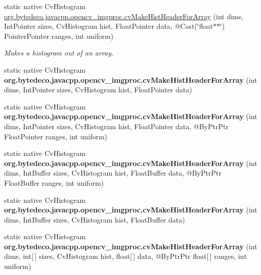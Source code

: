 \begin{DoxyCompactItemize}
\item 
static native Cv\+Histogram \hyperlink{group__imgproc__c_ga2bdfb77a902cc0010861d3960e11a5c9}{org.\+bytedeco.\+javacpp.\+opencv\+\_\+imgproc.\+cv\+Make\+Hist\+Header\+For\+Array} (int dims, Int\+Pointer sizes, Cv\+Histogram hist, Float\+Pointer data, @Cast(\char`\"{}float$\ast$$\ast$\char`\"{}) Pointer\+Pointer ranges, int uniform)
\begin{DoxyCompactList}\small\item\em Makes a histogram out of an array. \end{DoxyCompactList}\item 
\mbox{\label{group__imgproc__c_ga503497524c496d0a0bd9bcaf55c50490}} 
static native Cv\+Histogram {\bfseries org.\+bytedeco.\+javacpp.\+opencv\+\_\+imgproc.\+cv\+Make\+Hist\+Header\+For\+Array} (int dims, Int\+Pointer sizes, Cv\+Histogram hist, Float\+Pointer data)
\item 
\mbox{\label{group__imgproc__c_gafaedabac4c962960594e3a3651c6718e}} 
static native Cv\+Histogram {\bfseries org.\+bytedeco.\+javacpp.\+opencv\+\_\+imgproc.\+cv\+Make\+Hist\+Header\+For\+Array} (int dims, Int\+Pointer sizes, Cv\+Histogram hist, Float\+Pointer data, @By\+Ptr\+Ptr Float\+Pointer ranges, int uniform)
\item 
\mbox{\label{group__imgproc__c_gafee82abdcb505c7f765a0e654ad3dd17}} 
static native Cv\+Histogram {\bfseries org.\+bytedeco.\+javacpp.\+opencv\+\_\+imgproc.\+cv\+Make\+Hist\+Header\+For\+Array} (int dims, Int\+Buffer sizes, Cv\+Histogram hist, Float\+Buffer data, @By\+Ptr\+Ptr Float\+Buffer ranges, int uniform)
\item 
\mbox{\label{group__imgproc__c_ga0c3d0f9001f259bd01c0a5f1237398ba}} 
static native Cv\+Histogram {\bfseries org.\+bytedeco.\+javacpp.\+opencv\+\_\+imgproc.\+cv\+Make\+Hist\+Header\+For\+Array} (int dims, Int\+Buffer sizes, Cv\+Histogram hist, Float\+Buffer data)
\item 
\mbox{\label{group__imgproc__c_gaf8c231c42f2a447fb571eb8306df22f4}} 
static native Cv\+Histogram {\bfseries org.\+bytedeco.\+javacpp.\+opencv\+\_\+imgproc.\+cv\+Make\+Hist\+Header\+For\+Array} (int dims, int\mbox{[}$\,$\mbox{]} sizes, Cv\+Histogram hist, float\mbox{[}$\,$\mbox{]} data, @By\+Ptr\+Ptr float\mbox{[}$\,$\mbox{]} ranges, int uniform)
$$
\end{DoxyCompactItemize}
